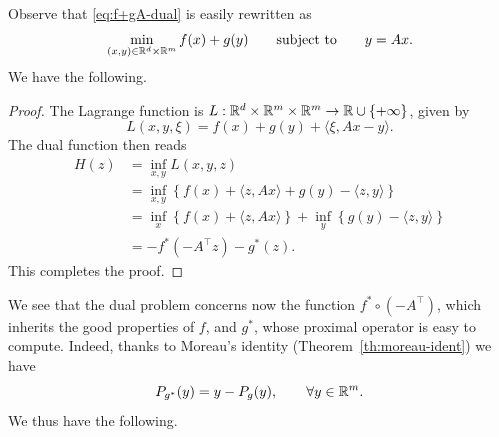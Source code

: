      Observe that \eqref{eq:f+gA-dual} is easily rewritten as
     \begin{equation}
         \label{eq:f+g+A-dual}
         \min_{(x,y)\in\mathbb{R}^{d}\times\mathbb{R}^{m}} f(x) + g(y)
         \qquad\text{subject to}\qquad
         y = Ax.
     \end{equation}
     We have the following.
 
 
     \begin{proof}
         The Lagrange function is $L:\mathbb{R}^d\times\mathbb{R}^m\times \mathbb{R}^m\to \mathbb{R}\cup\{+\infty\}$, given by
         \begin{equation}
             L(x,y,\xi) = f(x)+g(y) +\langle \xi, Ax-y\rangle.
         \end{equation}
         The dual function then reads
         \begin{equation}
             \begin{aligned}
                 H(z)
                  & = \inf_{x,y} L(x,y,z)                                                                    \\
                  & = \inf_{x,y} \left\{ f(x) + \langle z, Ax \rangle + g(y) - \langle z, y \rangle \right\} \\
                  & = \inf_{x} \left\{ f(x) + \langle z, Ax \rangle \right\}
                 + \inf_{y} \left\{ g(y) - \langle z, y \rangle \right\}                                     \\
                  & = - f^*(-A^\top z) - g^*(z).
             \end{aligned}
         \end{equation}
         This completes the proof.
     \end{proof}
 
     We see that the dual problem concerns now the function $f^*\circ (-A^\top)$, which inherits the good properties of $f$, and $g^*$, whose proximal operator is easy to compute. Indeed, thanks to Moreau's identity (Theorem~\ref{th:moreau-ident}) we have
 \begin{equation}
     P_{g^*}(y) = y - P_g(y), \qquad \forall y \in \mathbb{R}^m.
 \end{equation}
 We thus have the following.
 

